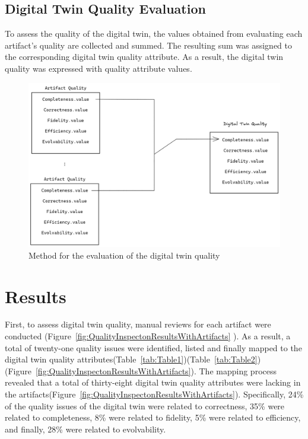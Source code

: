 \documentclass{llncs}
\begin{document}
    \subsection{Digital Twin Quality Evaluation}
    To assess the quality of the digital twin, the values obtained from evaluating each artifact's quality are collected and summed. 
    The resulting sum was assigned to the corresponding digital twin quality attribute. 
    As a result, the digital twin quality was expressed with quality attribute values.    
  

    \begin{figure}[htbp]
        \includegraphics[scale = 0.25]{DigitalTwinQuality.png}
            \caption{Method for the evaluation of the digital twin quality}
        \label{fig:MethodforDigitalTwinQuality}
    \end{figure}
   
    
    \section{Results}

    First, to assess digital twin quality, manual reviews for each artifact were conducted (Figure~\ref{fig:QualityInspectonResultsWithArtifacts} ). 
    As a result, a total of twenty-one quality issues were identified, listed and finally mapped to the digital twin quality attributes(Table~\ref{tab:Table1})(Table~\ref{tab:Table2})(Figure~\ref{fig:QualityInspectonResultsWithArtifacts}).
    The mapping process revealed that a total of thirty-eight digital twin quality attributes were lacking in the artifacts(Figure~\ref{fig:QualityInspectonResultsWithArtifacts}).  
    Specifically, 24\% of the quality issues of the digital twin were related to correctness, 35\%  were related to completeness, 8\%  were related to fidelity, 5\%  were related to efficiency,
    and finally, 28\% were related to evolvability.  
\end{document}
